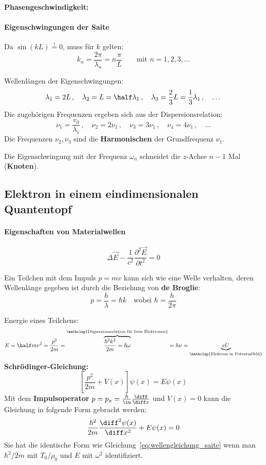 			\textbf{Phasengeschwindigkeit:}
		\paragraph{Eigenschwingungen der Saite} %
			Da $\sin(kL) \overset{!}= 0$, muss für $k$ gelten:
			\[
				k_n = \frac{2\pi}{\lambda_n} = n \frac \pi L \qquad
				\text{mit } n = 1,2,3,\dots
			\]
			
			Wellenlängen der Eigenschwingungen:
			\[
				\lambda_1 = 2L\,,\quad
				\lambda_2 = L = \half \lambda_1\,,\quad
				\lambda_3 = \frac 2 3 L = \frac 1 3 \lambda_1\,,\quad \dots
			\]
			Die zugehörigen Frequenzen ergeben sich aus der Dispersionsrelation:
			\[
				\nu_1 = \frac{v_0}{\lambda_1}\,,\quad
				\nu_2 = 2\nu_1\,,\quad
				\nu_3 = 3\nu_1\,,\quad
				\nu_4 = 4\nu_1\,,\quad \dots
			\]
			Die Frequenzen $\nu_2, \nu_3$ sind die \textbf{Harmonischen} der Grundfrequenz $\nu_1$.
			
			Die Eigenschwingung mit der Frequenz $\omega_n$ schneidet die $z$-Achse $n-1$ Mal (\textbf{Knoten}).
	\subsection{Elektron in einem eindimensionalen Quantentopf} %
		\paragraph{Eigenschaften von Materialwellen} %
			\[
				\Delta \vec E - \frac{1}{c^2} \frac{\partial^2 \vec E}{\partial t^2} = 0
			\]

			Ein Teilchen mit dem Impuls $p = mv$ kann sich wie eine Welle verhalten, deren Wellenlänge gegeben ist durch die Beziehung von \textbf{de Broglie}:
			\[
				p = \frac h \lambda = \hbar k \quad
				\text{wobei } \hbar = \frac h {2\pi}
			\]
			
			Energie eines Teilchens:
			\[
				E = \half mv^2 = \frac{p^2}{2m}
					= \overbrace{\frac{\hbar^2 k^2}{2m} = \hbar \omega}^{
							\mathclap{\text{Dispersionsrelation für freie Elektronen}}
						}
					= h\nu = \underbrace{eU}_{\mathclap{\text{Elektron in Potentialfeld}}}
			\]
			\textbf{Schrödinger-Gleichung:}
			\[
				\left[
					\frac{p^2}{2m} + V(x)
				\right] \psi(x) = E \psi(x)
			\]
			Mit dem \textbf{Impulsoperator} $p = p_x = \frac \hbar \iu \frac{\diff}{\diff x}$
			und $V(x) = 0$ kann die Gleichung in folgende Form gebracht werden:
			\[
				\frac{\hbar^2}{2m} \frac{\diff^2\psi(x)}{\diff x^2} + E\psi(x) = 0
			\]
			Sie hat die identische Form wie Gleichung~\eqref{eq:wellengleichung_saite} wenn man $\hbar^2/2m$ mit $T_0/\rho_0$ und $E$ mit $\omega^2$ identifiziert.
			
